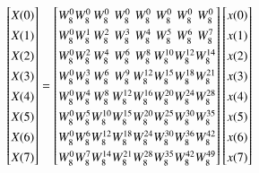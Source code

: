 \documentclass[journal,12pt,twocolumn]{IEEEtran}
\renewcommand\thesection{\arabic{section}}
\begin{document}
\begin{enumerate}[label=\thesection.\arabic*.,ref=\thesection.\theenumi]
\begin{equation}
\renewcommand{\arraystretch}{1.35}
\setlength\arraycolsep{0.05pt}
\begin{bmatrix}
X(0) \\
X(1) \\
X(2) \\
X(3) \\
X(4) \\
X(5) \\
X(6) \\
X(7)
\end{bmatrix}
=
\begin{bmatrix}
W^{0}_{8} & W^{0}_{8} & W^{0}_{8} & W^{0}_{8} & W^{0}_{8} & W^{0}_{8} & W^{0}_{8} & W^{0}_{8}\\
W^{0}_{8} & W^{1}_{8} & W^{2}_{8} & W^{3}_{8} & W^{4}_{8} & W^{5}_{8} & W^{6}_{8} & W^{7}_{8}\\
W^{0}_{8} & W^{2}_{8} & W^{4}_{8} & W^{6}_{8} & W^{8}_{8} & W^{10}_{8} & W^{12}_{8} & W^{14}_{8}\\
W^{0}_{8} & W^{3}_{8} & W^{6}_{8} & W^{9}_{8} & W^{12}_{8} & W^{15}_{8} & W^{18}_{8} & W^{21}_{8}\\
W^{0}_{8} & W^{4}_{8} & W^{8}_{8} & W^{12}_{8} & W^{16}_{8} & W^{20}_{8} & W^{24}_{8} & W^{28}_{8}\\
W^{0}_{8} & W^{5}_{8} & W^{10}_{8} & W^{15}_{8} & W^{20}_{8} & W^{25}_{8} & W^{30}_{8} & W^{35}_{8}\\
W^{0}_{8} & W^{6}_{8} & W^{12}_{8} & W^{18}_{8} & W^{24}_{8} & W^{30}_{8} & W^{36}_{8} & W^{42}_{8}\\
W^{0}_{8} & W^{7}_{8} & W^{14}_{8} & W^{21}_{8} & W^{28}_{8} & W^{35}_{8} & W^{42}_{8} & W^{49}_{8}
\end{bmatrix}
\begin{bmatrix}
x(0) \\
x(1) \\
x(2) \\
x(3) \\
x(4) \\
x(5) \\
x(6) \\
x(7)
\end{bmatrix}
\end{equation}


\end{enumerate}
\end{document}
